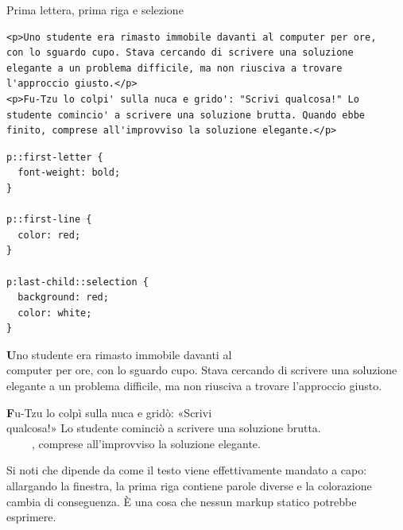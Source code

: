 \begin{esempio}{Prima lettera, prima riga e selezione}
\begin{affianco}[0.55]
\codicepiccolo
\begin{lstlisting}[style=html, name=pseudoelementi.html]
<p>Uno studente era rimasto immobile davanti al computer per ore,
con lo sguardo cupo. Stava cercando di scrivere una soluzione
elegante a un problema difficile, ma non riusciva a trovare
l'approccio giusto.</p>
<p>Fu-Tzu lo colpi' sulla nuca e grido': "Scrivi qualcosa!" Lo
studente comincio' a scrivere una soluzione brutta. Quando ebbe
finito, comprese all'improvviso la soluzione elegante.</p>
\end{lstlisting}
\begin{lstlisting}[style=css, name=pseudoelementi.css]
p::first-letter {
  font-weight: bold;
}

p::first-line {
  color: red;
}

p:last-child::selection {
  background: red;
  color: white;
}
\end{lstlisting}
\risultato
\begin{browser}
  \raggedright
  {\color{css-red}\textbf{U}no studente era rimasto immobile davanti al}\\
  computer per ore, con lo sguardo cupo. Stava cercando di scrivere una
  soluzione elegante a un problema difficile, ma non riusciva a trovare
  l'approccio giusto.\par\vspace{6pt}
  {\color{css-red}\textbf{F}u-Tzu lo colpì sulla nuca e gridò: «Scrivi}\\
  qualcosa!» Lo studente cominciò a scrivere una soluzione brutta.
  {\setlength{\fboxsep}{0.5pt}\colorbox{css-red}{\textcolor{white}{Quando ebbe
  finito}}}, comprese all'improvviso la soluzione elegante.
\end{browser}
\end{affianco}

Si noti che  dipende da come il testo viene effettivamente
mandato a capo: allargando la finestra, la prima riga contiene parole diverse e
la colorazione cambia di conseguenza. È una cosa che nessun markup statico
potrebbe esprimere.
\end{esempio}

